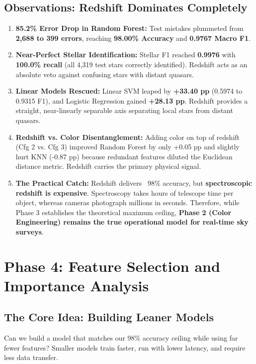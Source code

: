 \documentclass[11pt,a4paper]{article}
\begin{document}
\subsection{Observations: Redshift Dominates Completely}
\begin{enumerate}[noitemsep]
    \item \textbf{85.2\% Error Drop in Random Forest:} Test mistakes plummeted from \textbf{2,688 to 399 errors}, reaching \textbf{98.00\% Accuracy} and \textbf{0.9767 Macro F1}.
    \item \textbf{Near-Perfect Stellar Identification:} Stellar F1 reached \textbf{0.9976} with \textbf{100.0\% recall} (all 4,319 test stars correctly identified). Redshift acts as an absolute veto against confusing stars with distant quasars.
    \item \textbf{Linear Models Rescued:} Linear SVM leaped by \textbf{+33.40 pp} (0.5974 to 0.9315 F1), and Logistic Regression gained \textbf{+28.13 pp}. Redshift provides a straight, near-linearly separable axis separating local stars from distant quasars.
    \item \textbf{Redshift vs. Color Disentanglement:} Adding color on top of redshift (Cfg 2 vs. Cfg 3) improved Random Forest by only +0.05 pp and slightly hurt KNN (-0.87 pp) because redundant features diluted the Euclidean distance metric. Redshift carries the primary physical signal.
    \item \textbf{The Practical Catch:} Redshift delivers ~98\% accuracy, but \textbf{spectroscopic redshift is expensive}. Spectroscopy takes hours of telescope time per object, whereas cameras photograph millions in seconds. Therefore, while Phase 3 establishes the theoretical maximum ceiling, \textbf{Phase 2 (Color Engineering) remains the true operational model for real-time sky surveys}.
\end{enumerate}

\section{Phase 4: Feature Selection and Importance Analysis}

\subsection{The Core Idea: Building Leaner Models}
Can we build a model that matches our 98\% accuracy ceiling while using far fewer features? Smaller models train faster, run with lower latency, and require less data transfer.
\end{document}

